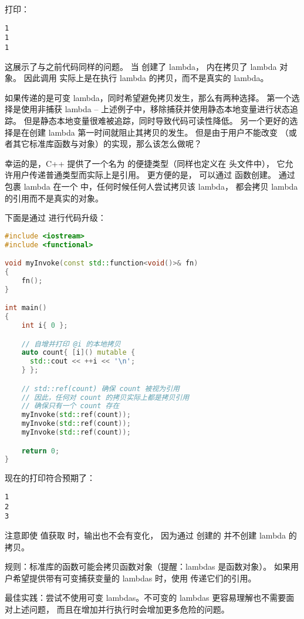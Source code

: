 \documentclass[../../LearnCpp.tex]{subfiles}
\begin{document}
打印：

\begin{lstlisting}
1
1
1
\end{lstlisting}

这展示了与之前代码同样的问题。
当  创建了 lambda， 内在拷贝了 lambda 对象。
因此调用  实际上是在执行 lambda 的拷贝，而不是真实的 lambda。

如果传递的是可变 lambda，同时希望避免拷贝发生，那么有两种选择。
第一个选择是使用非捕获 lambda -- 上述例子中，移除捕获并使用静态本地变量进行状态追踪。
但是静态本地变量很难被追踪，同时导致代码可读性降低。
另一个更好的选择是在创建 lambda 第一时间就阻止其拷贝的发生。
但是由于用户不能改变  （或者其它标准库函数与对象）的实现，那么该怎么做呢？

幸运的是，C++ 提供了一个名为  的便捷类型（同样也定义在  头文件中），
它允许用户传递普通类型而实际上是引用。
更方便的是， 可以通过  函数创建。
通过包裹 lambda 在一个  中，任何时候任何人尝试拷贝该 lambda，
都会拷贝 lambda 的引用而不是真实的对象。

下面是通过  进行代码升级：

\begin{lstlisting}[language=C++]
#include <iostream>
#include <functional>

void myInvoke(const std::function<void()>& fn)
{
    fn();
}

int main()
{
    int i{ 0 };

    // 自增并打印 @i 的本地拷贝
    auto count{ [i]() mutable {
      std::cout << ++i << '\n';
    } };

    // std::ref(count) 确保 count 被视为引用
    // 因此，任何对 count 的拷贝实际上都是拷贝引用
    // 确保只有一个 count 存在
    myInvoke(std::ref(count));
    myInvoke(std::ref(count));
    myInvoke(std::ref(count));

    return 0;
}
\end{lstlisting}

现在的打印符合预期了：

\begin{lstlisting}
1
2
3
\end{lstlisting}

注意即使  值获取  时，输出也不会有变化，
因为通过  创建的  并不创建 lambda 的拷贝。

规则：标准库的函数可能会拷贝函数对象（提醒：lambdas 是函数对象）。
如果用户希望提供带有可变捕获变量的 lambdas 时，使用  传递它们的引用。

最佳实践：尝试不使用可变 lambdas。不可变的 lambdas 更容易理解也不需要面对上述问题，
而且在增加并行执行时会增加更多危险的问题。
\end{document}
